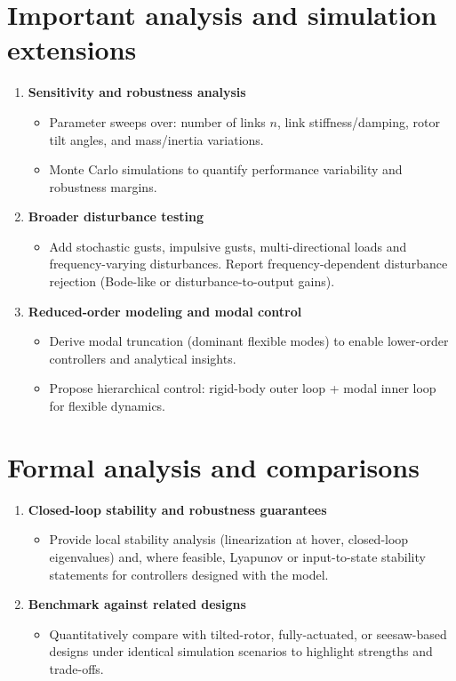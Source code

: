 \documentclass[11pt,letterpaper]{article}
\begin{document}
\section*{Important analysis and simulation extensions}
\begin{enumerate}[resume,left=0pt,label=\textbf{\arabic*.},wide=0pt]
  \item \textbf{Sensitivity and robustness analysis}
    \begin{itemize}
      \item Parameter sweeps over: number of links $n$, link stiffness/damping, rotor tilt angles, and mass/inertia variations.
      \item Monte Carlo simulations to quantify performance variability and robustness margins.
    \end{itemize}

  \item \textbf{Broader disturbance testing}
    \begin{itemize}
      \item Add stochastic gusts, impulsive gusts, multi-directional loads and frequency-varying disturbances. Report frequency-dependent disturbance rejection (Bode-like or disturbance-to-output gains).
    \end{itemize}

  \item \textbf{Reduced-order modeling and modal control}
    \begin{itemize}
      \item Derive modal truncation (dominant flexible modes) to enable lower-order controllers and analytical insights.
      \item Propose hierarchical control: rigid-body outer loop + modal inner loop for flexible dynamics.
    \end{itemize}
\end{enumerate}

\section*{Formal analysis and comparisons}
\begin{enumerate}[resume,left=0pt,label=\textbf{\arabic*.},wide=0pt]
  \item \textbf{Closed-loop stability and robustness guarantees}
    \begin{itemize}
      \item Provide local stability analysis (linearization at hover, closed-loop eigenvalues) and, where feasible, Lyapunov or input-to-state stability statements for controllers designed with the model.
    \end{itemize}

  \item \textbf{Benchmark against related designs}
    \begin{itemize}
      \item Quantitatively compare with tilted-rotor, fully-actuated, or seesaw-based designs under identical simulation scenarios to highlight strengths and trade-offs.
    \end{itemize}
\end{enumerate}
\end{document}
